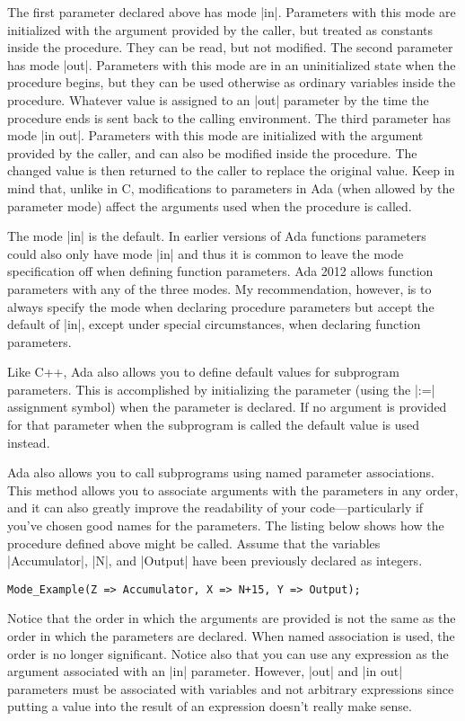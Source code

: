 The first parameter declared above has mode |in|. Parameters with this mode are initialized with
the argument provided by the caller, but treated as constants inside the procedure. They can be
read, but not modified. The second parameter has mode |out|. Parameters with this mode are in an
uninitialized state when the procedure begins, but they can be used otherwise as ordinary
variables inside the procedure. Whatever value is assigned to an |out| parameter by the time the
procedure ends is sent back to the calling environment. The third parameter has mode |in out|.
Parameters with this mode are initialized with the argument provided by the caller, and can also
be modified inside the procedure. The changed value is then returned to the caller to replace
the original value. Keep in mind that, unlike in C, modifications to parameters in Ada (when
allowed by the parameter mode) affect the arguments used when the procedure is called.

The mode |in| is the default. In earlier versions of Ada functions parameters could also only
have mode |in| and thus it is common to leave the mode specification off when defining function
parameters. Ada 2012 allows function parameters with any of the three modes. My recommendation,
however, is to always specify the mode when declaring procedure parameters but accept the
default of |in|, except under special circumstances, when declaring function parameters.

Like C++, Ada also allows you to define default values for subprogram parameters. This is
accomplished by initializing the parameter (using the |:=| assignment symbol) when the parameter
is declared. If no argument is provided for that parameter when the subprogram is called the
default value is used instead.

Ada also allows you to call subprograms using named parameter associations. This method allows
you to associate arguments with the parameters in any order, and it can also greatly improve the
readability of your code---particularly if you've chosen good names for the parameters. The
listing below shows how the procedure defined above might be called. Assume that the variables
|Accumulator|, |N|, and |Output| have been previously declared as integers.

\begin{lstlisting}
Mode_Example(Z => Accumulator, X => N+15, Y => Output);
\end{lstlisting}

\noindent Notice that the order in which the arguments are provided is not the same as the order
in which the parameters are declared. When named association is used, the order is no longer
significant. Notice also that you can use any expression as the argument associated with an |in|
parameter. However, |out| and |in out| parameters must be associated with variables and not
arbitrary expressions since putting a value into the result of an expression doesn't really
make sense.


